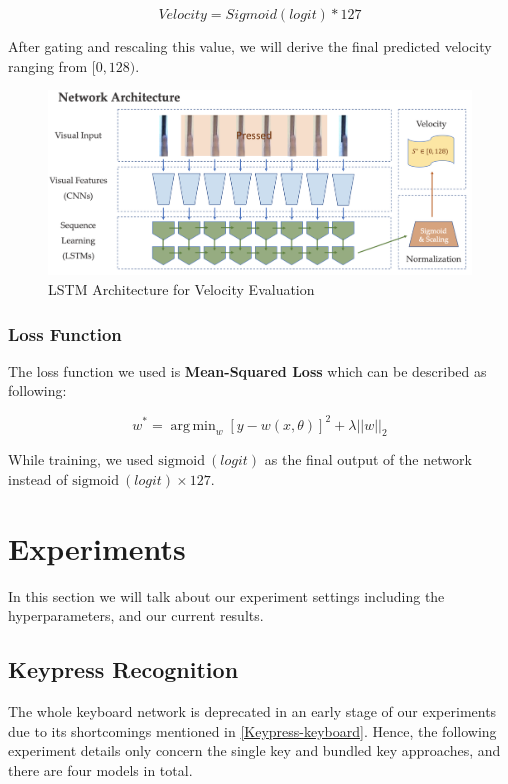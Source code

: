 \documentclass[10pt,twocolumn,letterpaper]{article}
\DeclareMathOperator*{\argmin}{arg\,min}
\begin{document}
   \[Velocity = Sigmoid(logit) * 127\]
   
After gating and rescaling this value, we will derive the final predicted velocity ranging from \([0, 128)\).

   \begin{figure}[h!]
      \centering
      \includegraphics[width=\linewidth]{fig/13.png}
      \caption{LSTM Architecture for Velocity Evaluation} \label{fig:5}
   \end{figure}

   \subsubsection{Loss Function}

   The loss function we used is \textbf{Mean-Squared Loss} which can be described as following:

   \[w^*=\argmin_w[y - w(x, \theta)]^2+\lambda||w||_2\]

   While training, we used \(\text{sigmoid}\ (logit)\) as the final output of the network instead of \(\text{sigmoid}\ (logit) \times 127\).

\section{Experiments}

In this section we will talk about our experiment settings including the hyperparameters, and our current results.

\subsection{Keypress Recognition}

The whole keyboard network is deprecated in an early stage of our experiments due to its shortcomings mentioned in \ref{Keypress-keyboard}. 
Hence, the following experiment details only concern the single key and bundled key approaches, and there are four models in total.
\end{document}

